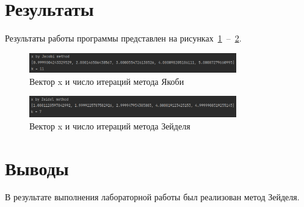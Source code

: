 \documentclass[a4paper, 14pt]{extarticle}
\begin{document}
\section{Результаты}\label{Sect::res}

Результаты работы программы представлен на рисунках~\ref{fig:img1}~--~\ref{fig:img2}.

\begin{figure}[!htb]
	\centering
	\includegraphics[width=0.8\textwidth]{img1}
\caption{Вектор x и число итераций метода Якоби}
\label{fig:img1}
\end{figure}

\begin{figure}[!htb]
	\centering
	\includegraphics[width=0.8\textwidth]{img2}
\caption{Вектор x и число итераций метода Зейделя}
\label{fig:img2}
\end{figure}

\section{Выводы}\label{Sect::conclusion}

В результате выполнения лабораторной работы был реализован метод Зейделя.
\end{document}
